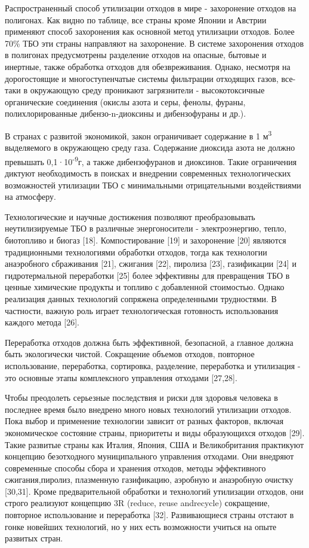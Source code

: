 \begin{multicols}{2}
Распространенный способ утилизации отходов в мире - захоронение отходов
на полигонах. Как видно по таблице, все страны кроме Японии и Австрии
применяют способ захоронения как основной метод утилизации отходов.
Более 70\% ТБО эти страны направляют на захоронение. В системе
захоронения отходов в полигонах предусмотрены разделение отходов на
опасные, бытовые и инертные, также обработка отходов для обезвреживания.
Однако, несмотря на дорогостоящие и многоступенчатые системы фильтрации
отходящих газов, все-таки в окружающую среду проникают загрязнители -
высокотоксичные органические соединения (окислы азота и серы, фенолы,
фураны, полихлорированные дибензо-n-диоксины и дибензофураны и др.).

В странах с развитой экономикой, закон ограничивает содержание в 1
м\textsuperscript{3} выделяемого в окружающею среду газа. Содержание
диоксида азота не должно превышать 0,1·10\textsuperscript{-9}г, а также
дибензофуранов и диоксинов. Такие ограничения диктуют необходимость в
поисках и внедрении современных технологических возможностей утилизации
ТБО с минимальными отрицательными воздействиями на атмосферу.

Технологические и научные достижения позволяют преобразовывать
неутилизируемые ТБО в различные энергоносители - электроэнергию, тепло,
биотопливо и биогаз {[}18{]}. Компостирование {[}19{]} и захоронение
{[}20{]} являются традиционными технологиями обработки отходов, тогда
как технологии анаэробного сбраживания {[}21{]}, сжигания {[}22{]},
пиролиза {[}23{]}, газификации {[}24{]} и гидротермальной переработки
{[}25{]} более эффективны для превращения ТБО в ценные химические
продукты и топливо с добавленной стоимостью. Однако реализация данных
технологий сопряжена определенными трудностями. В частности, важную роль
играет технологическая готовность использования каждого метода {[}26{]}.

Переработка отходов должна быть эффективной, безопасной, а главное
должна быть экологически чистой. Сокращение объемов отходов, повторное
использование, переработка, сортировка, разделение, переработка и
утилизация - это основные этапы комплексного управления отходами
{[}27,28{]}.

Чтобы преодолеть серьезные последствия и риски для здоровья человека в
последнее время было внедрено много новых технологий утилизации отходов.
Пока выбор и применение технологии зависит от разных факторов, включая
экономическое состояние страны, приоритеты и виды образующихся отходов
{[}29{]}. Такие развитые страны как Италия, Япония, США и Великобритания
практикуют концепцию безотходного муниципального управления отходами.
Они внедряют современные способы сбора и хранения отходов, методы
эффективного сжигания,пиролиз, плазменную газификацию, аэробную и
анаэробную очистку {[}30,31{]}. Кроме предварительной обработки и
технологий утилизации отходов, они строго реализуют концепцию 3R
(reduce, reuse andrecycle) сокращение, повторное использование и
переработка {[}32{]}. Развивающиеся страны отстают в гонке новейших
технологий, но у них есть возможности учиться на опыте развитых стран.


\end{multicols}
